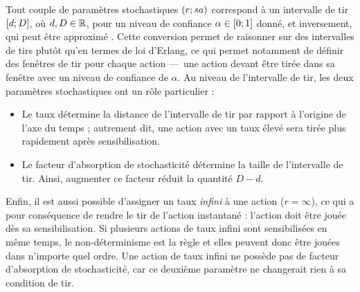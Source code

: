 Tout couple de paramètres stochastiques $\mathopen{(}r\mathclose{};sa\mathclose{)}$
correspond à un intervalle de tir $\mathopen{[}d\mathclose{};D\mathclose{]}$, où $d, D \in \mathbb{R}$,
pour un niveau de confiance $\alpha \in \mathopen{[}0\mathclose{};1\mathclose{]}$ donné,
et inversement, qui peut être approximé \cite[p.~72]{Pauleve11}.
Cette conversion permet de raisonner sur des intervalles de tirs
plutôt qu'en termes de loi d'Erlang,
ce qui permet notamment de définir des fenêtres de tir pour chaque action
---~une action devant être tirée dans sa fenêtre avec un niveau de confiance de $\alpha$.
Au niveau de l'intervalle de tir, les deux paramètres stochastiques ont un rôle particulier :
\begin{itemize}
  \item Le taux détermine la distance de l'intervalle de tir par rapport à l'origine
    de l'axe du temps ; autrement dit, une action avec un taux élevé sera tirée
    plus rapidement après sensibilisation.
  \item Le facteur d'absorption de stochasticité détermine la taille de l'intervalle de tir.
    Ainsi, augmenter ce facteur réduit la quantité $D - d$.
\end{itemize}

Enfin, il est aussi possible d'assigner un taux \emph{infini} à une action ($r = \infty$),
ce qui a pour conséquence de rendre le tir de l'action instantané :
l'action doit être jouée dès sa sensibilisation.
Si plusieurs actions de taux infini sont sensibilisées en même temps,
le non-déterminisme est la règle et elles peuvent donc être jouées dans n'importe quel ordre.
Une action de taux infini ne possède pas de facteur d'absorption de stochasticité,
car ce deuxième paramètre ne changerait rien à sa condition de tir.

